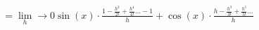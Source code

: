 \documentclass[preview]{standalone}
\begin{document}
\begin{align*}
= \lim\limits_ h \to 0 \sin(x) \cdot \frac{1 - \frac{h^2}{2!} + \frac{h^4}{4!} \dots - 1}{h} + \cos(x) \cdot \frac{h - \frac{h^3}{3!} + \frac{h^5}{5!} \dots}{h}
\end{align*}
\end{document}

